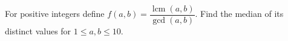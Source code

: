 For positive integers define $f(a,b)=\dfrac{\operatorname{lcm}(a,b)}{\gcd(a,b)}$. Find the median of its distinct values for $1\le a,b\le10$.
